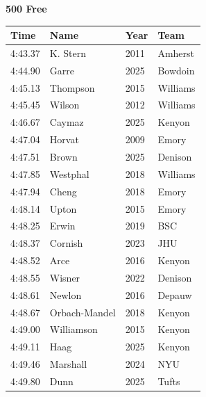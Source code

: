 \noindent\begin{minipage}[t]{0.98\textwidth}
\centering
\textbf{\textcolor{teamprimary}{500 Free}}\par
\vspace{0.5em}
\centering
\small
\renewcommand{\arraystretch}{1.0}
\setlength{\tabcolsep}{4pt}
\begin{tabular}{@{}p{2.5cm}p{4.5cm}p{1.5cm}p{2.5cm}@{}}
\toprule
\textbf{Time} & \textbf{Name} & \textbf{Year} & \textbf{Team} \\
\midrule
4:43.37 & K. Stern & 2011 & Amherst \\
4:44.90 & Garre & 2025 & Bowdoin \\
4:45.13 & Thompson & 2015 & Williams \\
4:45.45 & Wilson & 2012 & Williams \\
4:46.67 & Caymaz & 2025 & Kenyon \\
4:47.04 & Horvat & 2009 & Emory \\
4:47.51 & Brown & 2025 & Denison \\
4:47.85 & Westphal & 2018 & Williams \\
4:47.94 & Cheng & 2018 & Emory \\
4:48.14 & Upton & 2015 & Emory \\
4:48.25 & Erwin & 2019 & BSC \\
4:48.37 & Cornish & 2023 & JHU \\
4:48.52 & Arce & 2016 & Kenyon \\
4:48.55 & Wisner & 2022 & Denison \\
4:48.61 & Newlon & 2016 & Depauw \\
4:48.67 & Orbach-Mandel & 2018 & Kenyon \\
4:49.00 & Williamson & 2015 & Kenyon \\
4:49.11 & Haag & 2025 & Kenyon \\
4:49.46 & Marshall & 2024 & NYU \\
4:49.80 & Dunn & 2025 & Tufts \\
\bottomrule
\end{tabular}
\end{minipage}
\vspace{1.2em}

